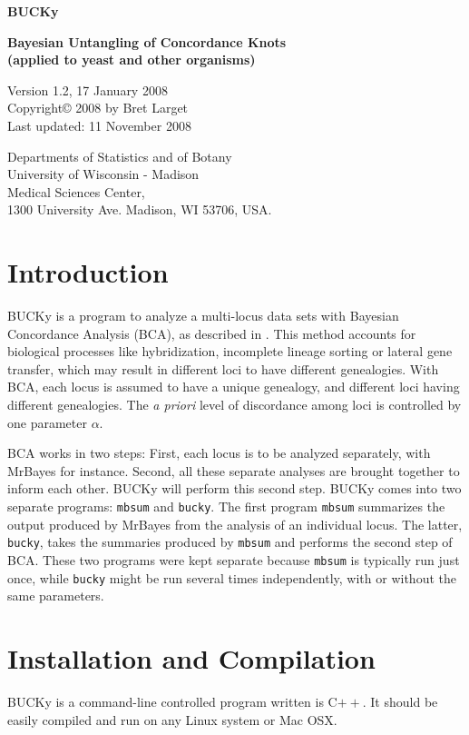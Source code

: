 \documentclass[12pt,english,final,letterpaper]{article}
\newcommand{\bu}{BUCKy}
\begin{document}
\begin{center}
{\Large\bf BUCKy}

{\bf Bayesian Untangling of Concordance Knots\\
(applied to yeast and other organisms)}
\bigskip

Version 1.2, 17 January 2008\\
Copyright\copyright{} 2008 by Bret Larget\\
Last updated: 11 November 2008
\medskip

{\small
Departments of Statistics and of Botany\\ 
University of Wisconsin - Madison\\ 
Medical Sciences Center,\\ 
1300 University Ave. Madison, WI 53706, USA.
}
\end{center}


\section{Introduction}
\bu{} is a program to analyze a multi-locus data sets with 
Bayesian Concordance Analysis (BCA), as described in \cite{ane-etal-2007}.
This method accounts for biological processes like hybridization, 
incomplete lineage sorting or lateral gene transfer, which may result
in different loci to have different genealogies. With BCA,
each locus is assumed to have a unique genealogy, and different
loci having different genealogies. The {\it a priori} level of 
discordance among loci is controlled by one parameter $\alpha$.

BCA works in two steps: First, each locus is to be analyzed 
separately, with MrBayes for instance. Second, all these separate
analyses are brought together to inform each other. \bu{} will
perform this second step.
\bu{} comes into two separate programs: {\tt mbsum} and {\tt bucky}.
The first program {\tt mbsum} summarizes the output produced by MrBayes
from the analysis of an individual locus. The latter, {\tt bucky}, 
takes the summaries produced by {\tt mbsum} and performs the second step
of BCA. These two programs were kept separate because {\tt mbsum}
is typically run just once, while {\tt bucky} might be run several
times  independently, with or without the same parameters.

\section{Installation and Compilation}
\bu{} is a command-line controlled program written is C$++$.
It should be easily compiled and run on any Linux system or Mac OSX. 
\end{document}
